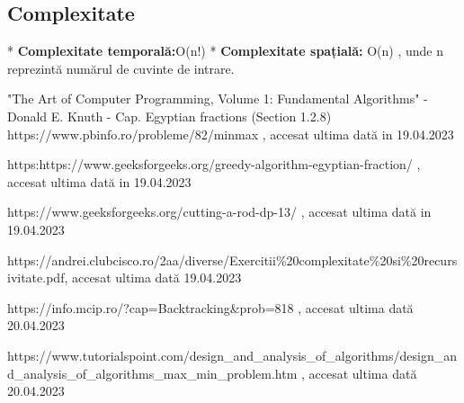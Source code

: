 \documentclass[runningheads]{llncs}
\begin{document}
\subsection{Complexitate}
* {\bfseries Complexitate temporală:}O(n!)\newline
  * { \bfseries Complexitate spațială:} O(n) \newline
  , unde n reprezintă numărul de cuvinte de intrare. 




\begin{thebibliography}{8}

"The Art of Computer Programming, Volume 1: Fundamental Algorithms" - Donald E. Knuth - Cap. Egyptian fractions (Section 1.2.8)
https://www.pbinfo.ro/probleme/82/minmax , accesat ultima dată in 19.04.2023

https:https://www.geeksforgeeks.org/greedy-algorithm-egyptian-fraction/ , accesat ultima dată in 19.04.2023

https://www.geeksforgeeks.org/cutting-a-rod-dp-13/ , accesat ultima dată in 19.04.2023

https://andrei.clubcisco.ro/2aa/diverse/Exercitii\%20complexitate\%20si\%20recursivitate.pdf, accesat ultima dată 19.04.2023


https://info.mcip.ro/?cap=Backtracking\&prob=818 , accesat ultima dată 20.04.2023

https://www.tutorialspoint.com/design\_and\_analysis\_of\_algorithms/design\_and\_analysis\_of\_algorithms\_max\_min\_problem.htm , accesat ultima dată 20.04.2023


\end{thebibliography}
\end{document}
